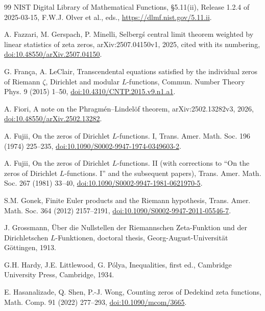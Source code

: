 \documentclass[11pt,a4paper]{article}
\numberwithin{equation}{section}
\theoremstyle{definition}
\theoremstyle{remark}
\begin{document}
\begin{thebibliography}{99}
 NIST Digital Library of Mathematical Functions, \S5.11(ii), Release 1.2.4 of 2025-03-15, F.W.J. Olver et al., eds., \url{https://dlmf.nist.gov/5.11.ii}.

 A. Fazzari, M. Gerspach, P. Minelli, Selberg\'s central limit theorem weighted by linear statistics of zeta zeros, arXiv:2507.04150v1, 2025, cited with its numbering, \href{https://doi.org/10.48550/arXiv.2507.04150}{doi:10.48550/arXiv.2507.04150}.

 G. Fran\c{c}a, A. LeClair, Transcendental equations satisfied by the individual zeros of Riemann $\zeta$, Dirichlet and modular $L$-functions, Commun. Number Theory Phys. 9 (2015) 1--50, \href{https://doi.org/10.4310/CNTP.2015.v9.n1.a1}{doi:10.4310/CNTP.2015.v9.n1.a1}.

 A. Fiori, A note on the Phragm\'en--Lindel\"of theorem, arXiv:2502.13282v3, 2026, \href{https://doi.org/10.48550/arXiv.2502.13282}{doi:10.48550/arXiv.2502.13282}.

 A. Fujii, On the zeros of Dirichlet $L$-functions. I, Trans. Amer. Math. Soc. 196 (1974) 225--235, \href{https://doi.org/10.1090/S0002-9947-1974-0349603-2}{doi:10.1090/S0002-9947-1974-0349603-2}.

 A. Fujii, On the zeros of Dirichlet $L$-functions. II (with corrections to ``On the zeros of Dirichlet $L$-functions. I'' and the subsequent papers), Trans. Amer. Math. Soc. 267 (1981) 33--40, \href{https://doi.org/10.1090/S0002-9947-1981-0621970-5}{doi:10.1090/S0002-9947-1981-0621970-5}.

 S.M. Gonek, Finite Euler products and the Riemann hypothesis, Trans. Amer. Math. Soc. 364 (2012) 2157--2191, \href{https://doi.org/10.1090/S0002-9947-2011-05546-7}{doi:10.1090/S0002-9947-2011-05546-7}.

 J. Grossmann, \"Uber die Nullstellen der Riemannschen Zeta-Funktion und der Dirichletschen $L$-Funktionen, doctoral thesis, Georg-August-Universit\"at G\"ottingen, 1913.

 G.H. Hardy, J.E. Littlewood, G. P\'olya, Inequalities, first ed., Cambridge University Press, Cambridge, 1934.

 E. Hasanalizade, Q. Shen, P.-J. Wong, Counting zeros of Dedekind zeta functions, Math. Comp. 91 (2022) 277--293, \href{https://doi.org/10.1090/mcom/3665}{doi:10.1090/mcom/3665}.


\end{thebibliography}
\end{document}
